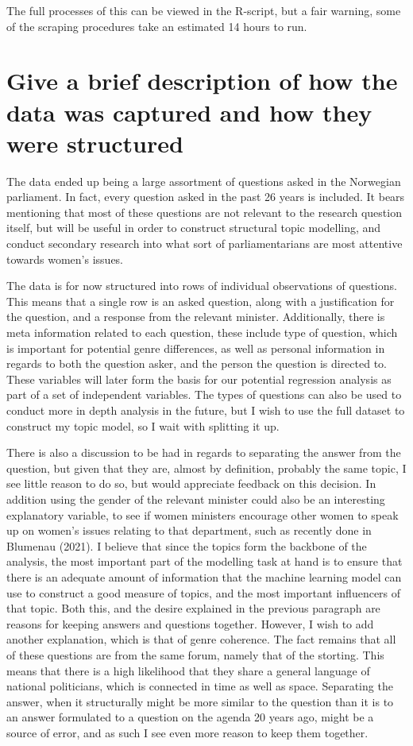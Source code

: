 \documentclass[12pt]{article}
\begin{document}
	The full processes of this can be viewed in the R-script, but a fair warning, some of the scraping procedures take an estimated 14 hours to run. 
	
	\section{Give a brief description of how the data was captured and how they were structured}
	
	The data ended up being a large assortment of questions asked in the Norwegian parliament. In fact, every question asked in the past 26 years is included. It bears mentioning that most of these questions are not relevant to the research question itself, but will be useful in order to construct structural topic modelling, and conduct secondary research into what sort of parliamentarians are most attentive towards women's issues. 
	
	The data is for now structured into rows of individual observations of questions. This means that a single row is an asked question, along with a justification for the question, and a response from the relevant minister. Additionally, there is meta information related to each question, these include type of question, which is important for potential genre differences, as well as personal information in regards to both the question asker, and the person the question is directed to. These variables will later form the basis for our potential regression analysis as part of a set of independent variables. The types of questions can also be used to conduct more in depth analysis in the future, but I wish to use the full dataset to construct my topic model, so I wait with splitting it up. 
	
	There is also a discussion to be had in regards to separating the answer from the question, but given that they are, almost by definition, probably the same topic, I see little reason to do so, but would appreciate feedback on this decision. In addition using the gender of the relevant minister could also be an interesting explanatory variable, to see if women ministers encourage other women to speak up on women's issues relating to that department, such as recently done in Blumenau (2021). I believe that since the topics form the backbone of the analysis, the most important part of the modelling task at hand is to ensure that there is an adequate amount of information that the machine learning model can use to construct a good measure of topics, and the most important influencers of that topic. Both this, and the desire explained in the previous paragraph are reasons for keeping answers and questions together. However, I wish to add another explanation, which is that of genre coherence. The fact remains that all of these questions are from the same forum, namely that of the storting. This means that there is a high likelihood that they share a general language of national politicians, which is connected in time as well as space. Separating the answer, when it structurally might be more similar to the question than it is to an answer formulated to a question on the agenda 20 years ago, might be a source of error, and as such I see even more reason to keep them together.
	
\end{document}
